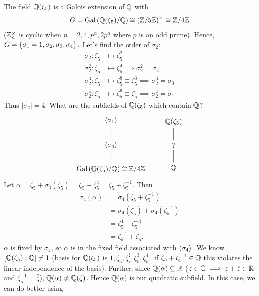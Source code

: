\begin{example}
    The field $\mathbb{Q}(\zeta_5)$ is a Galois extension of $\mathbb{Q}$ with
    \[G = \text{Gal}\left(\mathbb{Q}(\zeta_5)/\mathbb{Q}\right) \cong \left(\mathbb{Z}/5\mathbb{Z}\right)^\times \cong \mathbb{Z}/4\mathbb{Z}\]
    ($\mathbb{Z}_n^\times$ is cyclic when $n = 2, 4, p^\alpha, 2p^\alpha$ where $p$ is an odd prime). Hence, $G = \left\{\sigma_1 = 1, \sigma_2, \sigma_3, \sigma_4\right\}.$ Let's find the order of $\sigma_2$:
    \begin{align*}
        \sigma_2 : \zeta_5 &\mapsto \zeta_5^2 \\
        \sigma_2^2 : \zeta_5 &\mapsto \zeta_5^4 \implies \sigma_2^2 = \sigma_4 \\
        \sigma_2^3 : \zeta_5 &\mapsto \zeta_5^8 \equiv \zeta_5^3 \implies \sigma_2^3 = \sigma_3 \\
        \sigma_2^4 : \zeta_5 &\mapsto \zeta_5^6 \equiv \zeta_5 \implies \sigma_2^4 = \sigma_1
    \end{align*}
    Thus $|\sigma_2| = 4$. What are the subfields of $\mathbb{Q}(\zeta_5)$ which contain $\mathbb{Q}$? \\
    \[
     \begin{array}{ccc}
        \begin{tikzcd}[column sep=small]
            \cyc{\sigma_1} \arrow[d, dash] \\
            \cyc{\sigma_4} \arrow[d, dash] \\
            \Gal{\Q(\zeta_5)/\Q}\cong \Z/4\Z
        \end{tikzcd} & &
        \begin{tikzcd}[column sep=small]
            \Q(\zeta_5) \arrow[d, dash] \\
            ? \arrow[d, dash] \\
            \Q
        \end{tikzcd}
    \end{array}
    \]
    Let $\alpha = \zeta_5 + \sigma_4(\zeta_5)= \zeta_5 + \zeta_5^4 = \zeta_5 + \zeta_5^{-1}$. Then
    \begin{align*}
        \sigma_4(\alpha) &= \sigma_4(\zeta_5 + \zeta_5^{-1}) \\ 
        &= \sigma_4(\zeta_5) +\sigma_4(\zeta_5^{-1}) \\
        &=\zeta_5^4 + \zeta_5^{-4} \\
        &= \zeta_5^{-1} + \zeta_5.
    \end{align*}
    $\alpha$ is fixed by $\sigma_4$, so $\alpha$ is in the fixed field associated with $\left\langle \sigma_4 \right\rangle$. We know $[\mathbb{Q}(\zeta_5) : \mathbb{Q}] \neq 1$ (basis for $\mathbb{Q}(\zeta_5)$ is $1, \zeta_5, \zeta_5^2, \zeta_5^3, \zeta_5^4,$ if $\zeta_5+\zeta_5^{-1} \in \mathbb{Q}$ this violates the linear independence of the basis). Further, since $\mathbb{Q}(\alpha) \subseteq \mathbb{R}$ ($z \in \mathbb{C} \implies z + \bar{z} \in \mathbb{R}$ and $\zeta_5^{-1} = \bar{\zeta}$), $\mathbb{Q}(\alpha) \neq \mathbb{Q}(\zeta)$. Hence $\mathbb{Q}(\alpha)$ is our quadratic subfield. In this case, we can do better using

\end{example}
